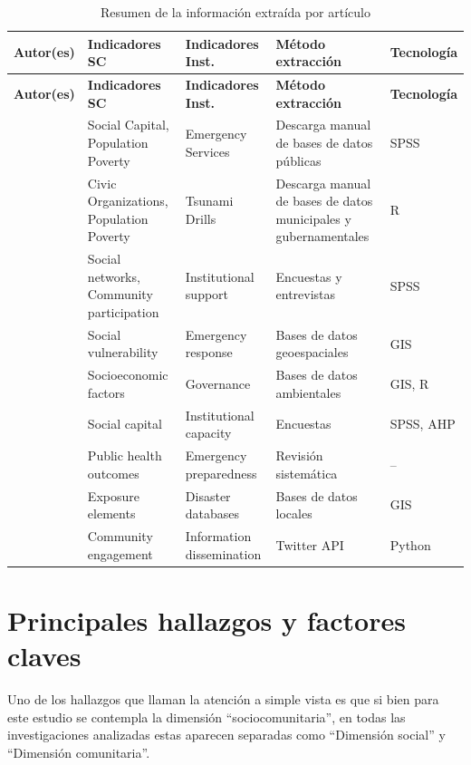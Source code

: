 \documentclass[12pt,letterpaper,oneside]{report}
\begin{document}
\begin{longtable}{|p{2.5cm}|p{2.5cm}|p{2.5cm}|p{2.5cm}|p{2.5cm}|}
\caption{Resumen de la informaci\'on extra\'ida por art\'iculo} \label{tab:resumen-articulos} \\
\hline
\textbf{Autor(es)} & \textbf{Indicadores SC} & \textbf{Indicadores Inst.} & \textbf{M\'etodo extracci\'on} & \textbf{Tecnolog\'ia} \\
\hline
\endfirsthead
\hline
\textbf{Autor(es)} & \textbf{Indicadores SC} & \textbf{Indicadores Inst.} & \textbf{M\'etodo extracci\'on} & \textbf{Tecnolog\'ia} \\
\hline
\endhead
\hline
\endfoot

\textcite{cutter2014} & Social Capital, Population Poverty & Emergency Services & Descarga manual de bases de datos p\'ublicas & SPSS \\
\hline
\textcite{villagra2017} & Civic Organizations, Population Poverty & Tsunami Drills & Descarga manual de bases de datos municipales y gubernamentales & R \\
\hline
\textcite{kamara2019} & Social networks, Community participation & Institutional support & Encuestas y entrevistas & SPSS \\
\hline
\textcite{heinzlef2020} & Social vulnerability & Emergency response & Bases de datos geoespaciales & GIS \\
\hline
\textcite{rumson2020} & Socioeconomic factors & Governance & Bases de datos ambientales & GIS, R \\
\hline
\textcite{moghadas2019} & Social capital & Institutional capacity & Encuestas & SPSS, AHP \\
\hline
\textcite{abrash2021} & Public health outcomes & Emergency preparedness & Revisi\'on sistem\'atica & -- \\
\hline
\textcite{muhamad2021} & Exposure elements & Disaster databases & Bases de datos locales & GIS \\
\hline
\textcite{wang2021} & Community engagement & Information dissemination & Twitter API & Python \\
\hline
\end{longtable}

\section{Principales hallazgos y factores claves}
\label{sec:hallazgos}

Uno de los hallazgos que llaman la atenci\'on a simple vista es que si bien para este estudio se contempla la dimensi\'on ``sociocomunitaria'', en todas las investigaciones analizadas estas aparecen separadas como ``Dimensi\'on social'' y ``Dimensi\'on comunitaria''.
\end{document}
